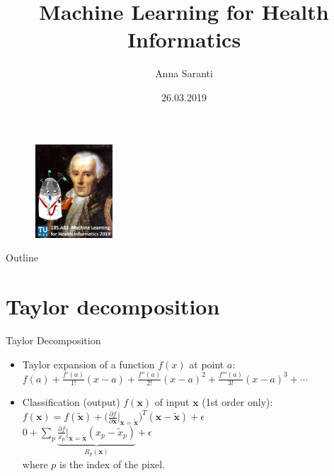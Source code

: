 \documentclass{beamer}
\title[Layer-wise Relevance Propagation (LRP) algorithm]{Machine Learning for Health Informatics}
\author{Anna Saranti}
\institute{Holzinger Group hci-kdd.org}
\date{26.03.2019}
\begin{document}
\begin{frame}
  \titlepage
  
  \begin{figure}[ht]
	\centering
    \includegraphics[width=3cm, height=3.5cm]{figures/HddKciLogo}
	\label{fig:HddKciLogo}
  \end{figure}
  
\end{frame}

\begin{frame}{Outline}
  \tableofcontents
\end{frame}

\section{Taylor decomposition}

\begin{frame}{Taylor Decomposition}

\begin{itemize}
  \item Taylor expansion of a function $f(x)$ at point $a$: \\
  $f(a) + \frac{f'(a)}{1!}(x-a) + \frac{f''(a)}{2!}(x-a)^2 + \frac{f'''(a)}{3!}(x-a)^3 + \cdots$
\end{itemize}

\begin{itemize}
  \item Classification (output) $f(\mathbf{x})$ of input $\mathbf{x}$ (1st order only): \\
  $f(\mathbf{x}) = f(\tilde{\mathbf{x}}) + \big( \frac{\partial f}{\partial \mathbf{x}} \biggr\rvert_{\mathbf{x} = \tilde{\mathbf{x}}} \big)^T
  (\mathbf{x} - \tilde{\mathbf{x}}) + \epsilon $ \\
  $0 + \sum_p \underbrace{\frac{\partial f}{x_p} \biggr\rvert_{\mathbf{x} = \tilde{\mathbf{x}}} (x_p - \tilde{x}_p)}_\text{$R_p(\mathbf{x})$} + \epsilon  $ \\
  where $p$ is the index of the pixel.
\end{itemize}

\end{frame}
\end{document}
